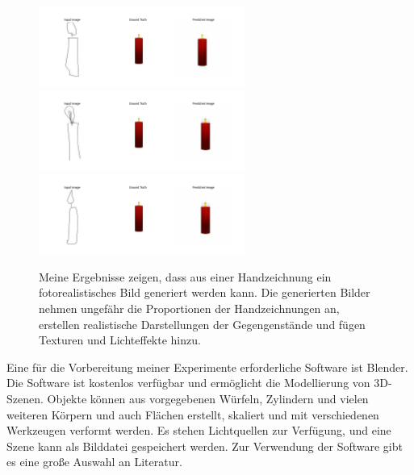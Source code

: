 \begin{figure}[h]
	\includegraphics[width=0.6\textwidth]{bilder/candle1small.png}
	\includegraphics[width=0.6\textwidth]{bilder/candle2small.png}
	\includegraphics[width=0.6\textwidth]{bilder/candle3small.png}
	\caption[Eigene Beispiele]{Meine Ergebnisse zeigen, dass aus einer Handzeichnung ein fotorealistisches Bild generiert werden kann. Die generierten Bilder nehmen ungefähr die Proportionen der Handzeichnungen an, erstellen realistische Darstellungen der Gegengenstände und fügen Texturen und Lichteffekte hinzu.}
	\label{fig:myexamples}
\end{figure}

Eine für die Vorbereitung meiner Experimente erforderliche Software ist Blender. Die Software ist kostenlos verfügbar und ermöglicht die Modellierung von 3D-Szenen. Objekte können aus vorgegebenen Würfeln, Zylindern und vielen weiteren Körpern und auch Flächen erstellt, skaliert und mit verschiedenen Werkzeugen verformt werden. Es stehen Lichtquellen zur Verfügung, und eine Szene kann als Bilddatei gespeichert werden. Zur Verwendung der Software gibt es eine große Auswahl an Literatur.
